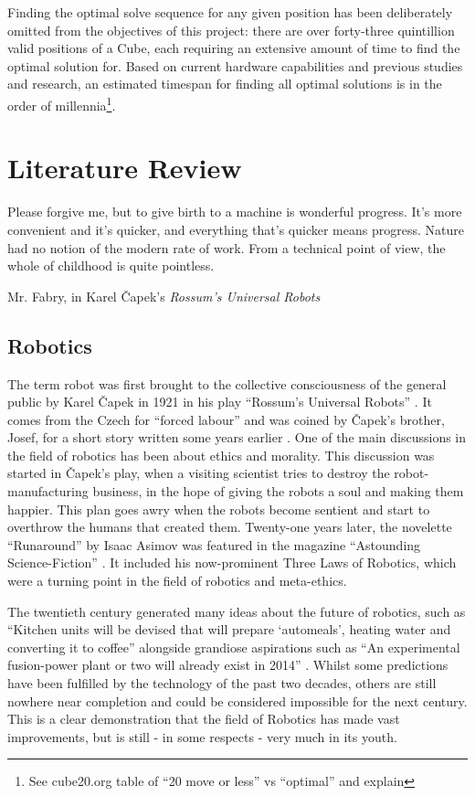\documentclass{report}
\begin{document}
    Finding the optimal solve sequence for any given position has been deliberately omitted from the objectives of this project: there are over forty-three quintillion valid positions of a Cube, each requiring an extensive amount of time to find the optimal solution for. Based on current hardware capabilities and previous studies and research, an estimated timespan for finding all optimal solutions is in the order of millennia\footnote{See cube20.org table of “20 move or less” vs “optimal” and explain}.
    
    \newpage
    \chapter{Literature Review}
    \epigraph{Please forgive me, but to give birth to a machine is wonderful progress. It's more convenient and it's quicker, and everything that's quicker means progress. Nature had no notion of the modern rate of work. From a technical point of view, the whole of childhood is quite pointless.}{Mr. Fabry, in Karel \v{C}apek's \textit{Rossum's Universal Robots \cite{Capek1921b}}}
    
    \section{Robotics}
    The term robot was first brought to the collective consciousness of the general public by Karel \v{C}apek in 1921 in his play \enquote{Rossum's Universal Robots} \cite{Capek1921b}. It comes from the Czech for \enquote{forced labour} and was coined by \v{C}apek's brother, Josef, for a short story written some years earlier \cite{Etymonline2017}. One of the main discussions in the field of robotics has been about ethics and morality. This discussion was started in \v{C}apek's play, when a visiting scientist tries to destroy the robot-manufacturing business, in the hope of giving the robots a soul and making them happier. This plan goes awry when the robots become sentient and start to overthrow the humans that created them. Twenty-one years later, the novelette \enquote{Runaround} by Isaac Asimov was featured in the magazine \enquote{Astounding Science-Fiction} \cite{Asimov1942b}. It included his now-prominent Three Laws of Robotics, which were a turning point in the field of robotics and meta-ethics.
    
    The twentieth century generated many ideas about the future of robotics, such as \enquote{Kitchen units will be devised that will prepare \enquote{automeals}, heating water and converting it to coffee} alongside grandiose aspirations such as \enquote{An experimental fusion-power plant or two will already exist in 2014} \cite{Asimov1964b}. Whilst some predictions have been fulfilled by the technology of the past two decades, others are still nowhere near completion and could be considered impossible for the next century. This is a clear demonstration that the field of Robotics has made vast improvements, but is still - in some respects - very much in its youth.
    
\end{document}
